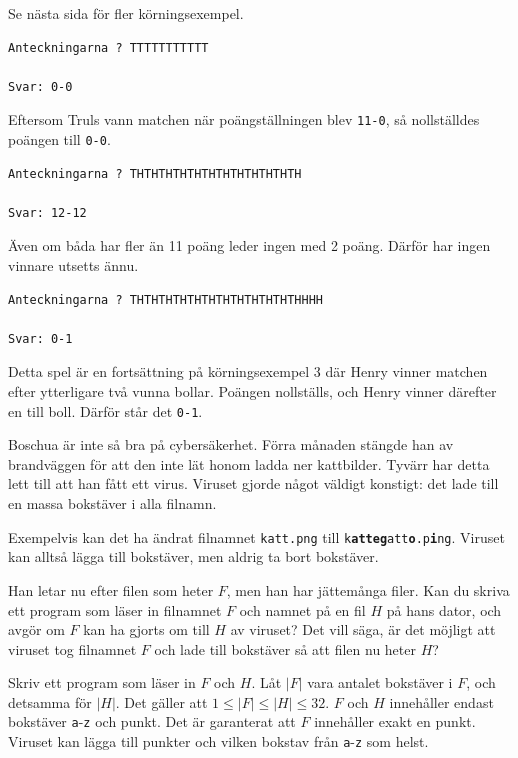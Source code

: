 Se nästa sida för fler körningsexempel.


\newpage

\begin{verbatim}
Anteckningarna ? TTTTTTTTTTT

Svar: 0-0
\end{verbatim}

 Eftersom Truls vann matchen när poängställningen blev \texttt{11-0}, så nollställdes poängen till \texttt{0-0}.

\vspace{0.5cm}

\begin{verbatim}
Anteckningarna ? THTHTHTHTHTHTHTHTHTHTHTH

Svar: 12-12
\end{verbatim}
 Även om båda har fler än 11 poäng leder ingen med 2 poäng. Därför har ingen vinnare utsetts ännu.


\begin{verbatim}
Anteckningarna ? THTHTHTHTHTHTHTHTHTHTHTHHHH

Svar: 0-1
\end{verbatim}
 Detta spel är en fortsättning på körningsexempel 3 där Henry vinner matchen efter ytterligare två vunna bollar. 
Poängen nollställs, och Henry vinner därefter en till boll. Därför står det \texttt{0-1}.


\newpage
{}

Boschua är inte så bra på cybersäkerhet. Förra månaden stängde han av brandväggen för att den
inte lät honom ladda ner kattbilder. Tyvärr har detta lett till att han fått ett virus. 
Viruset gjorde något väldigt konstigt: det lade till en massa bokstäver i alla filnamn.

Exempelvis kan det ha ändrat filnamnet \texttt{katt.png} till \texttt{k\textbf{atteg}att\textbf{o}.p\textbf{i}ng}.
Viruset kan alltså lägga till bokstäver, men aldrig ta bort bokstäver.

Han letar nu  efter filen som heter $F$, men han har jättemånga filer. Kan du skriva ett program som läser in filnamnet $F$ och namnet på en fil $H$
på hans dator, och avgör om $F$ kan ha gjorts om till $H$ av viruset? Det vill säga, är det möjligt att
viruset tog filnamnet $F$ och lade till bokstäver så att filen nu heter $H$?

Skriv ett program som läser in $F$ och $H$. Låt $|F|$ vara antalet bokstäver i $F$, och detsamma för $|H|$.
Det gäller att $1 \le |F| \le |H| \le 32$. $F$ och $H$ innehåller endast bokstäver \texttt{a}-\texttt{z} och punkt.
Det är garanterat att $F$ innehåller exakt en punkt. Viruset kan lägga till punkter och vilken bokstav från \texttt{a}-\texttt{z} som helst.


